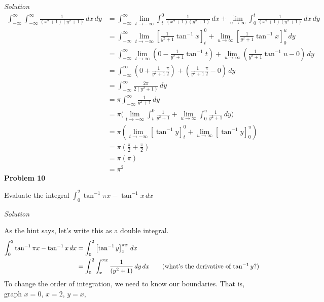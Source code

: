 \documentclass{article}
\newcommand{\lrp}[1]{\left( #1 \right)}
\newcommand{\lrb}[1]{\left[ #1 \right]}
\newcommand{\Solution}{\textit{Solution}}
\begin{document}
\Solution
\begin{align*}
    \int_{-\infty}^\infty\int_{-\infty}^\infty \frac{1}{(x^2+1)(y^2+1)}\,dx\,dy&=\int_{-\infty}^\infty \lim_{t\to -\infty}\int_{t}^0\frac{1}{(x^2+1)(y^2+1)}\,dx+\lim_{u\to\infty}\int_0^t\frac{1}{(x^2+1)(y^2+1)}\,dx\,dy\\
    &=\int_{-\infty}^\infty \lim_{t\to-\infty}\lrb{\frac{1}{y^2+1}\tan^{-1}x}_t^0+\lim_{u\to\infty}\lrb{\frac{1}{y^2+1}\tan^{-1}x}_0^u\,dy\\
    &=\int_{-\infty}^\infty \lim_{t\to\infty}\lrp{0-\frac{1}{y^2+1}\tan^{-1}t}+\lim_{u\to\infty}\lrp{\frac{1}{y^2+1}\tan^{-1}u-0}\,dy\\
    &=\int_{-\infty}^\infty \lrp{0+\frac{1}{y^2+1}\frac{\pi}{2}}+\lrp{\frac{1}{y^2+1}\frac{\pi}{2}-0}\,dy\\
    &=\int_{-\infty}^\infty \frac{2\pi}{2(y^2+1)}\,dy\\
    &=\pi\int_{-\infty}^\infty \frac{1}{y^2+1}\,dy\\
    &=\pi\Big(\lim_{t\to-\infty}\int_t^0\frac{1}{y^2+1}+\lim_{u\to\infty}\int_0^u\frac{1}{y^2+1}\,dy\Big)\\
    &=\pi\lrp{\lim_{t\to-\infty}\lrb{\tan^{-1}y}_t^0+\lim_{u\to\infty}\lrb{\tan^{-1}y}_0^u}\\
    &=\pi\lrp{\frac{\pi}{2}+\frac{\pi}{2}}\tag{we did this earlier}\\
    &=\pi\lrp{\pi}\\
    &=\boxed{\pi^2}
\end{align*}
\textbf{Problem 10}

Evaluate the integral $\displaystyle \int_0^2\tan^{-1}\pi x -\tan^{-1}x\,dx$

\Solution

As the hint says, let's write this as a double integral.
\begin{align*}
    \int_0^2\tan^{-1}\pi x -\tan^{-1}x\,dx&=\int_0^2\lrb{\tan^{-1}y}_{x}^{\pi x}\,dx\\
    &=\int_0^2\int_x^{\pi x} \frac{1}{(y^2+1)}\,dy\,dx\tag{what's the derivative of $\tan^{-1}y$?}
\end{align*}
To change the order of integration, we need to know our boundaries. That is, graph $x=0$, $x=2$, $y=x$, 
\end{document}
